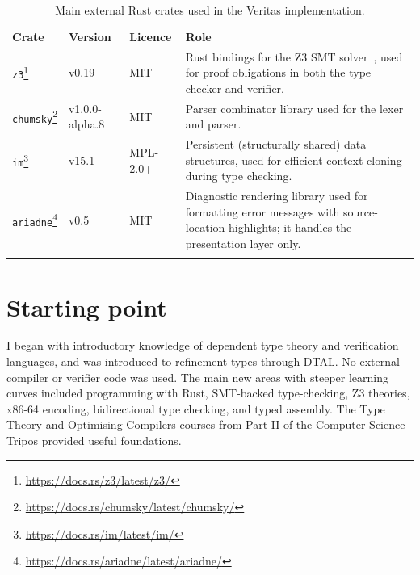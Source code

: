 \begin{table}[H]
  \centering
  \small
  \begin{tabular}{p{} p{} p{} p{}}
    \tablehline
    \textbf{Crate}                                                           & \textbf{Version} & \textbf{Licence} & \textbf{Role}                                                                                                                            \\
    \tablehline
    \texttt{z3}\footnote{\url{https://docs.rs/z3/latest/z3/}}                & v0.19            & MIT              & Rust bindings for the Z3 SMT solver~\cite{DeMoura2008Z3}, used for proof obligations in both the type checker and verifier.              \\
    \tablehline
    \texttt{chumsky}\footnote{\url{https://docs.rs/chumsky/latest/chumsky/}} & v1.0.0-alpha.8   & MIT              & Parser combinator library used for the lexer and parser.                                                                                 \\
    \tablehline
    \texttt{im}\footnote{\url{https://docs.rs/im/latest/im/}}                & v15.1            & MPL-2.0+         & Persistent (structurally shared) data structures, used for efficient context cloning during type checking.                               \\
    \tablehline
    \texttt{ariadne}\footnote{\url{https://docs.rs/ariadne/latest/ariadne/}} & v0.5             & MIT              & Diagnostic rendering library used for formatting error messages with source-location highlights; it handles the presentation layer only. \\
    \tablehline
  \end{tabular}
  \caption{Main external Rust crates used in the Veritas implementation.}
  \label{tab:veritas-crates}
\end{table}

\section{Starting point}\label{sec:starting-point}

I began with introductory knowledge of dependent type theory and verification languages, and was introduced to refinement types through DTAL. No external compiler or verifier code was used. The main new areas with steeper learning curves included programming with Rust, SMT-backed type-checking, Z3 theories, x86-64 encoding, bidirectional type checking, and typed assembly. The Type Theory and Optimising Compilers courses from Part II of the Computer Science Tripos provided useful foundations.
